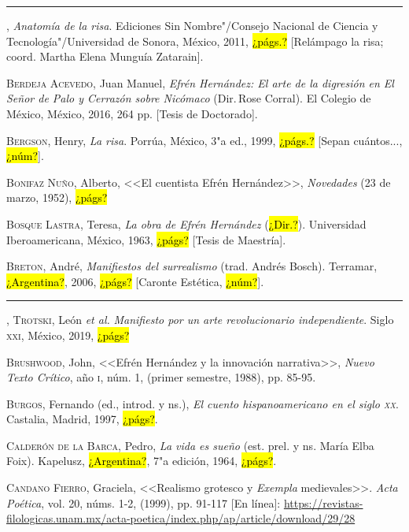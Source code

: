 \documentclass[14pt,twoside,final]{extbook} %
\begin{document}
\rule{1cm}{0.4pt}, \emph{Anatomía de la risa}. Ediciones Sin Nombre"/Consejo Nacional de Ciencia y Tecnología"/Universidad de Sonora, México, 2011, \hl{¿págs.?} [Relámpago la risa; coord. Martha Elena Munguía Zatarain].\label{bib:beltran2011}

\textsc{Berdeja Acevedo}, Juan Manuel, \emph{Efrén Hernández: El arte de la digresión en \emph{El Señor de Palo} y \emph{Cerrazón sobre Nicómaco}} (Dir.\,Rose Corral). El Colegio de México, México, 2016, 264 pp. [Tesis de Doctorado]. \label{bib:berdeja2016}

\textsc{Bergson}, Henry, \emph{La risa}. Porrúa, México, 3"a ed., 1999, \hl{¿págs.?} [Sepan cuántos..., \hl{¿núm?}].\label{bib:bergson1999}

\textsc{Bonifaz Nuño}, Alberto, <<El cuentista Efrén Hernández>>, \emph{Novedades} (23 de marzo, 1952), \hl{¿págs?}\label{bib:bonifaz1952}

\textsc{Bosque Lastra}, Teresa, \emph{La obra de Efrén Hernández} (\hl{¿Dir.?}). Universidad Iberoamericana, México, 1963, \hl{¿págs?} [Tesis de Maestría].\label{bib:bosque1963}

\textsc{Breton}, André, \emph{Manifiestos del surrealismo} (trad. Andrés Bosch). Terramar, \hl{¿Argentina?}, 2006, \hl{¿págs?} [Caronte Estética, \hl{¿núm?}].\label{bib:breton2006}

\rule{1cm}{0.4pt}, \textsc{Trotski}, León \emph{et al.} \emph{Manifiesto por un arte revolucionario independiente}. Siglo \textsc{xxi}, México, 2019, \hl{¿págs?}\label{bib:breton2019}

\textsc{Brushwood}, John, <<Efrén Hernández y la innovación narrativa>>, \emph{Nuevo Texto Crítico}, año \textsc{i}, núm. 1, (primer semestre, 1988), pp. 85-95.\label{bib:}

\textsc{Burgos}, Fernando (ed., introd. y ns.), \emph{El cuento hispanoamericano en el siglo \textsc{xx}}. Castalia, Madrid, 1997, \hl{¿págs?}.\label{bib:burgos1997}

\textsc{Calderón de la Barca}, Pedro, \emph{La vida es sueño} (est. prel. y ns. María Elba Foix). Kapelusz, \hl{¿Argentina?}, 7"a edición, 1964, \hl{¿págs?}.\label{bib:calderon1964}

\textsc{Candano Fierro}, Graciela, <<Realismo grotesco y \emph{Exempla} medievales>>. \emph{Acta Poética}, vol. 20, núms. 1-2, (1999), pp. 91-117 [En línea]: \href{https://revistas-filologicas.unam.mx/acta-poetica/index.php/ap/article/download/29/28}{https://revistas-filologicas.unam.mx/acta-poetica/index.php/ap/article/download/29/28}\label{bib:candano1999}
\end{document}
